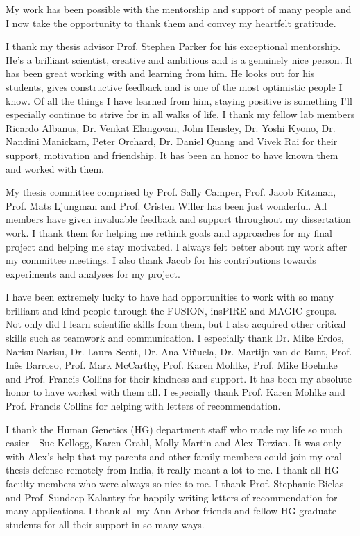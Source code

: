 My work has been possible with the mentorship and support of many people and I now take the opportunity to thank them and convey my heartfelt gratitude.

I thank my thesis advisor Prof. Stephen Parker for his exceptional mentorship. He's a brilliant scientist, creative and ambitious and is a genuinely nice person. It has been great working with and learning from him. He looks out for his students, gives constructive feedback and is one of the most optimistic people I know. Of all the things I have learned from him, staying positive is something I'll especially continue to strive for in all walks of life. I thank my fellow lab members Ricardo Albanus, Dr. Venkat Elangovan, John Hensley, Dr. Yoshi Kyono, Dr. Nandini Manickam, Peter Orchard, Dr. Daniel Quang and Vivek Rai for their support, motivation and friendship. It has been an honor to have known them and worked with them. 

My thesis committee comprised by Prof. Sally Camper, Prof. Jacob Kitzman, Prof. Mats Ljungman and Prof. Cristen Willer has been just wonderful. All members have given invaluable feedback and support throughout my dissertation work. I thank them for helping me rethink goals and approaches for my final project and helping me stay motivated. I always felt better about my work after my committee meetings. I also thank Jacob for his contributions towards experiments and analyses for my project.

I have been extremely lucky to have had opportunities to work with so many brilliant and kind people through the FUSION, insPIRE and MAGIC groups. Not only did I learn scientific skills from them, but I also acquired other critical skills such as teamwork and communication. I especially thank Dr. Mike Erdos, Narisu Narisu, Dr. Laura Scott, Dr. Ana Vi\~{n}uela, Dr. Martijn van de Bunt, Prof. In\^{e}s Barroso, Prof. Mark McCarthy, Prof. Karen Mohlke, Prof. Mike Boehnke and Prof. Francis Collins for their kindness and support. It has been my absolute honor to have worked with them all. I especially thank Prof. Karen Mohlke and Prof. Francis Collins for helping with letters of recommendation. 
                                
I thank the Human Genetics (HG) department staff who made my life so much easier - Sue Kellogg, Karen Grahl, Molly Martin and Alex Terzian. It was only with Alex's help that my parents and other family members could join my oral thesis defense remotely from India, it really meant a lot to me. I thank all HG faculty members who were always so nice to me. I thank Prof. Stephanie Bielas and Prof. Sundeep Kalantry for happily writing letters of recommendation for many applications. I thank all my Ann Arbor friends and fellow HG graduate students for all their support in so many ways.

